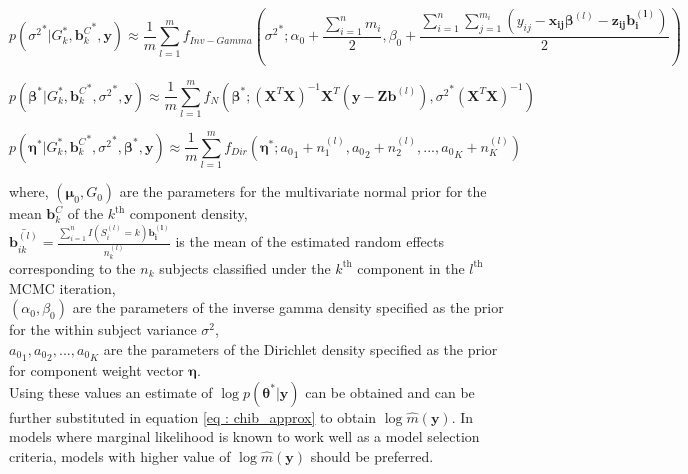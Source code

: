 \begin{equation}
p({\sigma^2}^*|G_k^*, {\boldsymbol{b}_k^C}^*, \boldsymbol{y}) \approx 
\frac 1 m \sum_{l=1}^m f_{Inv-Gamma}({\sigma^2}^*; \alpha_0 + \frac {\sum_{i=1}^n m_i} 2, 
\beta_0 + \frac {\sum_{i=1}^n \sum_{j=1}^{m_i} (y_{ij} - \boldsymbol{x_{ij}}\boldsymbol{\beta}^{(l)} - \boldsymbol{z_{ij}}\boldsymbol{b_i^{(l)}})} 2)
\end{equation}

\begin{equation}
p({\boldsymbol{\beta}}^*|G_k^*, {\boldsymbol{b}_k^C}^*, {\sigma^2}^*, \boldsymbol{y}) \approx 
\frac 1 m \sum_{l=1}^m f_N({\boldsymbol{\beta}}^*; (\boldsymbol{X}^T\boldsymbol{X})^{-1}\boldsymbol{X}^T(\boldsymbol{y} - {\boldsymbol{Zb}}^{(l)}), {\sigma^2}^*(\boldsymbol{X}^T\boldsymbol{X})^{-1})
\end{equation}

\begin{equation}
p({\boldsymbol{\eta}}^*|G_k^*, {\boldsymbol{b}_k^C}^*, {\sigma^2}^*,{\boldsymbol{\beta}}^*, \boldsymbol{y}) \approx 
\frac 1 m \sum_{l=1}^m f_{Dir}({\boldsymbol{\eta}}^*; {a_0}_1 + n_1^{(l)}, {a_0}_2 + n_2^{(l)}, ..., {a_0}_K + n_K^{(l)})
\end{equation}

where, 
$(\boldsymbol{\mu}_0, G_0)$ are the parameters for the multivariate normal prior for the mean $\boldsymbol{b}_k^C$ of the $k^\text{th}$ component density,\\
$\bar{\boldsymbol{b}_{ik}^{(l)}} = \frac {\sum_{i=1}^n I(S_i^{(l)}=k) \boldsymbol{b_i^{(l)}}} {n_k^{(l)}}$ is the mean of the estimated random effects corresponding to the $n_k$ subjects classified under the $k^\text{th}$ component in the $l^\text{th}$ MCMC iteration,\\
$(\alpha_0, \beta_0)$ are the parameters of the inverse gamma density specified as the prior for the within subject variance $\sigma^2$,\\
${a_0}_1, {a_0}_2,..., {a_0}_K$ are the parameters of the Dirichlet density specified as the prior for component weight vector $\boldsymbol{\eta}$.\\

Using these values an estimate of $\log{p(\boldsymbol{\theta}^*|\boldsymbol{y})}$ can be obtained and can be further substituted in equation \ref{eq : chib_approx} to obtain $\log{\hat{m}(\boldsymbol{y})}$. In models where marginal likelihood is known to work well as a model selection criteria, models with higher value of $\log{\hat{m}(\boldsymbol{y})}$ should be preferred.


